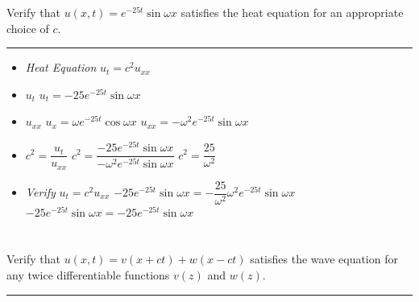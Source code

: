 \documentclass[10pt]{article}
\begin{document}
\noindent
Verify that $ u(x,t) = e^{-25t}\sin{\omega x} $ satisfies the heat equation for an appropriate choice of $ c $.  \\
\vspace{2.5mm}

\hrule

\vspace{7.5mm}

\begin{itemize}
    \item \textit{Heat Equation} $ u_{t} = c^2u_{xx} $
    \item $ u_{t} $
    \subitem  $ u_{t} = -25e^{-25t}\sin{\omega x} $
    \item $ u_{xx} $
    \subitem $ u_{x} = \omega e^{-25t}\cos{\omega x} $
    \subitem $ u_{xx} = -\omega^2 e^{-25t}\sin{\omega x} $
    \item $ \displaystyle c^2 = \dfrac{u_{t}}{u_{xx}} $
    \subitem $ c^2 = \dfrac{-25e^{-25t}\sin{\omega x}}{-\omega^2 e^{-25t}\sin{\omega x}} $
    \subitem $ \displaystyle c^2 = \dfrac{25}{\omega^2} $
    \item \textit{Verify} $ u_{t} = c^2u_{xx} $
    \subitem $ -25e^{-25t}\sin{\omega x} = -\dfrac{25}{\omega^2}\omega^2 e^{-25t}\sin{\omega x} $
    \subitem $ -25e^{-25t}\sin{\omega x} = -25e^{-25t}\sin{\omega x} $
\end{itemize}

\newpage

\section{\underline{}}
\label{sec: Problem 3}

\noindent
Verify that $ u(x,t) = v(x+ct) + w(x-ct) $ satisfies the wave equation for any twice differentiable functions $ v(z) $ and $ w(z) $.  \\
\vspace{2.5mm}

\hrule

\vspace{7.5mm}
\end{document}
